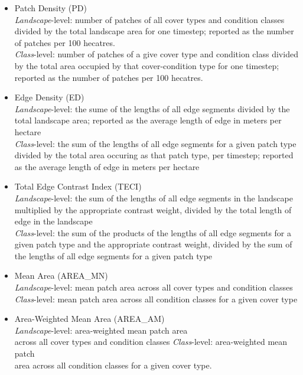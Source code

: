 \begin{itemize}
\begin{itemize}
		\item Patch Density (PD)\\
		\emph{Landscape}-level: number of patches of all cover types and condition classes divided by the total landscape area for one timestep; reported as the number of patches per 100 hecatres.\\
		\emph{Class}-level: number of patches of a give cover type and condition class divided by the total area occupied by that cover-condition type for one timestep; reported as the number of patches per 100 hecatres.\\
		
		\item Edge Density (ED) \\
		\emph{Landscape}-level: the sume of the lengths of all edge segments divided by the total landscape area; reported as the average length of edge in meters per hectare\\	
		\emph{Class}-level: the sum of the lengths of all edge segments for a given patch type divided by the total area occuring as that patch type, per timestep; reported as the average length of edge in meters per hectare\\

		\item Total Edge Contrast Index (TECI) \\
		\emph{Landscape}-level: the sum of the lengths of all edge segments in the landscape multiplied by the appropriate contrast weight, divided by the total length of edge in the landscape\\
		\emph{Class}-level: the sum of the products of the lengths of all edge segments for a given patch type and the appropriate contrast weight,  divided by the sum of the lengths of all edge segments for a given patch type \\
		
		\item Mean Area (AREA\_MN)\\
		\emph{Landscape}-level:  mean patch area across all cover types and condition classes\\
		\emph{Class}-level:  mean patch area across all condition classes for a given cover type\\
		
		\item Area-Weighted Mean Area (AREA\_AM)\\
		\emph{Landscape}-level: area-weighted mean patch area\\ across all cover types and condition classes
		\emph{Class}-level: area-weighted mean patch \\area across all condition classes for a given cover type.
		

\end{itemize}
\end{itemize}

